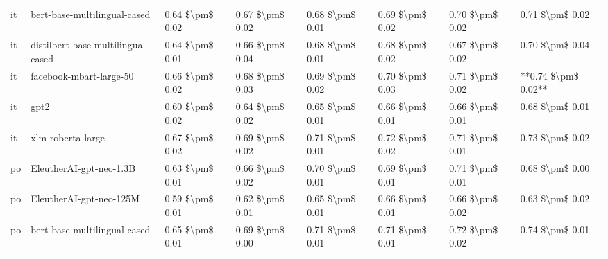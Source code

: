\begin{tabular}{llllllll}
      it &       bert-base-multilingual-cased & 0.64 \$\textbackslash pm\$ 0.02 &           0.67 \$\textbackslash pm\$ 0.02 &       0.68 \$\textbackslash pm\$ 0.01 &        0.69 \$\textbackslash pm\$ 0.02 &                         0.70 \$\textbackslash pm\$ 0.02 &     0.71 \$\textbackslash pm\$ 0.02 \\
      it & distilbert-base-multilingual-cased & 0.64 \$\textbackslash pm\$ 0.01 &           0.66 \$\textbackslash pm\$ 0.04 &       0.68 \$\textbackslash pm\$ 0.01 &        0.68 \$\textbackslash pm\$ 0.02 &                         0.67 \$\textbackslash pm\$ 0.02 &     0.70 \$\textbackslash pm\$ 0.04 \\
      it &            facebook-mbart-large-50 & 0.66 \$\textbackslash pm\$ 0.02 &           0.68 \$\textbackslash pm\$ 0.03 &       0.69 \$\textbackslash pm\$ 0.02 &        0.70 \$\textbackslash pm\$ 0.03 &                         0.71 \$\textbackslash pm\$ 0.02 & **0.74 \$\textbackslash pm\$ 0.02** \\
      it &                               gpt2 & 0.60 \$\textbackslash pm\$ 0.02 &           0.64 \$\textbackslash pm\$ 0.02 &       0.65 \$\textbackslash pm\$ 0.01 &        0.66 \$\textbackslash pm\$ 0.01 &                         0.66 \$\textbackslash pm\$ 0.01 &     0.68 \$\textbackslash pm\$ 0.01 \\
      it &                  xlm-roberta-large & 0.67 \$\textbackslash pm\$ 0.02 &           0.69 \$\textbackslash pm\$ 0.02 &       0.71 \$\textbackslash pm\$ 0.01 &        0.72 \$\textbackslash pm\$ 0.02 &                         0.71 \$\textbackslash pm\$ 0.01 &     0.73 \$\textbackslash pm\$ 0.02 \\
      po &            EleutherAI-gpt-neo-1.3B & 0.63 \$\textbackslash pm\$ 0.01 &           0.66 \$\textbackslash pm\$ 0.02 &       0.70 \$\textbackslash pm\$ 0.01 &        0.69 \$\textbackslash pm\$ 0.01 &                         0.71 \$\textbackslash pm\$ 0.01 &     0.68 \$\textbackslash pm\$ 0.00 \\
      po &            EleutherAI-gpt-neo-125M & 0.59 \$\textbackslash pm\$ 0.01 &           0.62 \$\textbackslash pm\$ 0.01 &       0.65 \$\textbackslash pm\$ 0.01 &        0.66 \$\textbackslash pm\$ 0.01 &                         0.66 \$\textbackslash pm\$ 0.02 &     0.63 \$\textbackslash pm\$ 0.02 \\
      po &       bert-base-multilingual-cased & 0.65 \$\textbackslash pm\$ 0.01 &           0.69 \$\textbackslash pm\$ 0.00 &       0.71 \$\textbackslash pm\$ 0.01 &        0.71 \$\textbackslash pm\$ 0.01 &                         0.72 \$\textbackslash pm\$ 0.02 &     0.74 \$\textbackslash pm\$ 0.01 \\

\end{tabular}
